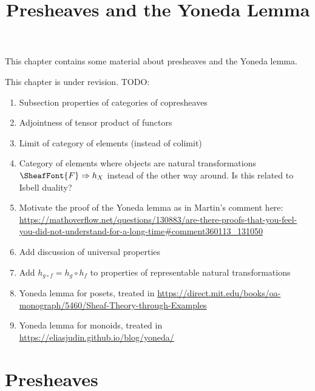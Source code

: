 

%



\title{Presheaves and the Yoneda Lemma}

\maketitle

\label{section-phantom}

This chapter contains some material about presheaves and the Yoneda lemma.

This chapter is under revision. TODO:
\begin{enumerate}
    \item Subsection properties of categories of copresheaves
    \item Adjointness of tensor product of functors
    \item Limit of category of elements (instead of colimit)
    \item Category of elements where objects are natural transformations $\SheafFont{F}\Rightarrow h_{X}$ instead of the other way around. Is this related to Isbell duality?
    \item Motivate the proof of the Yoneda lemma as in Martin's comment here: \url{https://mathoverflow.net/questions/130883/are-there-proofs-that-you-feel-you-did-not-understand-for-a-long-time#comment360113_131050}
    \item Add discussion of universal properties
    \item Add $h_{g\circ f}=h_{g}\circ h_{f}$ to properties of representable natural transformations
    \item Yoneda lemma for posets, treated in \url{https://direct.mit.edu/books/oa-monograph/5460/Sheaf-Theory-through-Examples}
    \item Yoneda lemma for monoids, treated in \url{https://eliasjudin.github.io/blog/yoneda/}
\end{enumerate}

\ChapterTableOfContents

\section{Presheaves}\label{section-presheaves}
